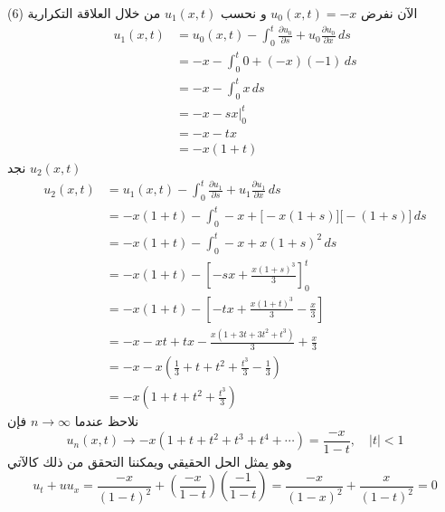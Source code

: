 الآن نفرض $u_0(x,t) = -x$ و نحسب $u_1(x, t)$ من خلال العلاقة التكرارية (6)
\begin{align*}
	u_1(x, t) &= u_0(x, t) - \int_{0}^t \frac{\partial u_0}{\partial s} + u_0 \frac{\partial u_0}{\partial x} \, ds\\
	&= -x - \int_{0}^t 0 + (-x)(-1) \, ds\\
	&= -x - \int_{0}^t x \, ds\\
	&= -x - sx \Big|_0^t\\
	&= -x -tx\\
	&= -x(1+t)
\end{align*}
نجد $u_2(x, t)$
\begin{align*}
	u_2(x, t) &= u_1(x, t) - \int_{0}^t \frac{\partial u_1}{\partial s} + u_1 \frac{\partial u_1}{\partial x} \, ds\\
	&= -x(1+t) - \int_{0}^t -x + \big[-x(1+s)\big]\big[-(1+s)\big]\, ds\\
	&= -x(1+t) - \int_{0}^t -x + x(1+s)^2\, ds\\
	&= -x(1+t) - \left[-sx + \frac{x(1+s)^3}{3}\right]_0^t\\
	&= -x(1+t) - \left[-tx + \frac{x(1+t)^3}{3} - \frac{x}{3}\right]\\
	&= -x -xt + tx - \frac{x(1+3t + 3t^2 + t^3)}{3} + \frac{x}{3}\\
	&= -x - x \left(\frac{1}{3} + t + t^2 + \frac{t^3}{3} - \frac{1}{3}\right) \\
	&= -x \left(1+t+t^2 + \frac{t^3}{3}\right)
\end{align*}
نلاحظ عندما $n \to \infty$ فإن 
\[
u_n(x ,t) \to -x (1+t+t^2+t^3+t^4 + \cdots) = \frac{-x}{1-t} , \quad |t| < 1
\]
وهو يمثل الحل الحقيقي ويمكننا التحقق من ذلك كالآتي
\[
u_t + u u_x = \frac{-x}{(1-t)^2} + \left(\frac{-x}{1-t}\right)\left(\frac{-1}{1-t}\right) = \frac{-x}{(1-x)^2} + \frac{x}{(1-t)^2} = 0
\]